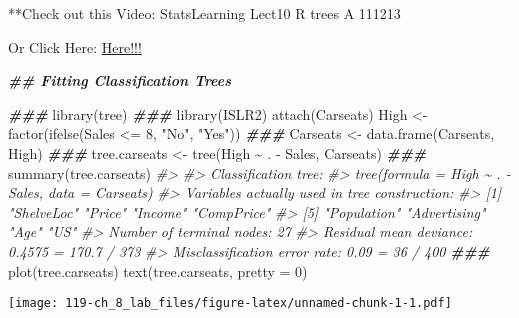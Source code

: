 \documentclass[
]{book}
\newenvironment{Shaded}{\begin{snugshade}}{\end{snugshade}}
\newcommand{\AttributeTok}[1]{\textcolor[rgb]{0.77,0.63,0.00}{#1}}
\newcommand{\CommentTok}[1]{\textcolor[rgb]{0.56,0.35,0.01}{\textit{#1}}}
\newcommand{\DecValTok}[1]{\textcolor[rgb]{0.00,0.00,0.81}{#1}}
\newcommand{\DocumentationTok}[1]{\textcolor[rgb]{0.56,0.35,0.01}{\textbf{\textit{#1}}}}
\newcommand{\FunctionTok}[1]{\textcolor[rgb]{0.00,0.00,0.00}{#1}}
\newcommand{\NormalTok}[1]{#1}
\newcommand{\OtherTok}[1]{\textcolor[rgb]{0.56,0.35,0.01}{#1}}
\newcommand{\SpecialCharTok}[1]{\textcolor[rgb]{0.00,0.00,0.00}{#1}}
\newcommand{\StringTok}[1]{\textcolor[rgb]{0.31,0.60,0.02}{#1}}
\begin{document}
**Check out this Video: StatsLearning Lect10 R trees A 111213

Or Click Here: \href{https://www.youtube.com/watch?v=YPz2J5lHeVM\&list=PLAOUn-KLSAVOqj5TG8E1HTb8Txwxe6OtV\&index=6}{Here!!!}

\begin{Shaded}
\begin{Highlighting}[]

\DocumentationTok{\#\# Fitting Classification Trees}

\DocumentationTok{\#\#\#}
\FunctionTok{library}\NormalTok{(tree)}
\DocumentationTok{\#\#\#}
\FunctionTok{library}\NormalTok{(ISLR2)}
\FunctionTok{attach}\NormalTok{(Carseats)}
\NormalTok{High }\OtherTok{\textless{}{-}} \FunctionTok{factor}\NormalTok{(}\FunctionTok{ifelse}\NormalTok{(Sales }\SpecialCharTok{\textless{}=} \DecValTok{8}\NormalTok{, }\StringTok{"No"}\NormalTok{, }\StringTok{"Yes"}\NormalTok{))}
\DocumentationTok{\#\#\#}
\NormalTok{Carseats }\OtherTok{\textless{}{-}} \FunctionTok{data.frame}\NormalTok{(Carseats, High)}
\DocumentationTok{\#\#\#}
\NormalTok{tree.carseats }\OtherTok{\textless{}{-}} \FunctionTok{tree}\NormalTok{(High }\SpecialCharTok{\textasciitilde{}}\NormalTok{ . }\SpecialCharTok{{-}}\NormalTok{ Sales, Carseats)}
\DocumentationTok{\#\#\#}
\FunctionTok{summary}\NormalTok{(tree.carseats)}
\CommentTok{\#\textgreater{} }
\CommentTok{\#\textgreater{} Classification tree:}
\CommentTok{\#\textgreater{} tree(formula = High \textasciitilde{} . {-} Sales, data = Carseats)}
\CommentTok{\#\textgreater{} Variables actually used in tree construction:}
\CommentTok{\#\textgreater{} [1] "ShelveLoc"   "Price"       "Income"      "CompPrice"  }
\CommentTok{\#\textgreater{} [5] "Population"  "Advertising" "Age"         "US"         }
\CommentTok{\#\textgreater{} Number of terminal nodes:  27 }
\CommentTok{\#\textgreater{} Residual mean deviance:  0.4575 = 170.7 / 373 }
\CommentTok{\#\textgreater{} Misclassification error rate: 0.09 = 36 / 400}
\DocumentationTok{\#\#\#}
\FunctionTok{plot}\NormalTok{(tree.carseats)}
\FunctionTok{text}\NormalTok{(tree.carseats, }\AttributeTok{pretty =} \DecValTok{0}\NormalTok{)}
\end{Highlighting}
\end{Shaded}

\texttt{[image: 119-ch\_8\_lab\_files/figure-latex/unnamed-chunk-1-1.pdf]}
\end{document}
